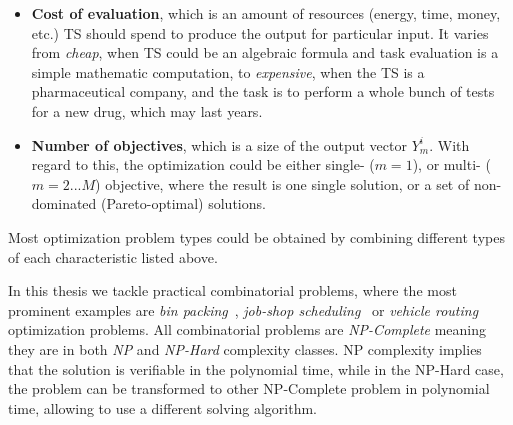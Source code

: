 \begin{itemize}
	\item \textbf{Cost of evaluation}, which is an amount of resources (energy, time, money, etc.) TS should spend to produce the output for particular input. It varies from \emph{cheap}, when TS could be an algebraic formula and task evaluation is a simple mathematic computation, to \emph{expensive}, when the TS is a pharmaceutical company, and the task is to perform a whole bunch of tests for a new drug, which may last years. 

	\item \textbf{Number of objectives}, which is a size of the output vector $Y_m^i$. With regard to this, the optimization could be either single- ($m=1$), or multi- ($m=2...M$) objective, where the result is one single solution, or a set of non-dominated (Pareto-optimal) solutions.
\end{itemize}

Most optimization problem types could be obtained by combining different types of each characteristic listed above.

In this thesis we tackle practical combinatorial problems, where the most prominent examples are \emph{bin packing}~\cite{martello1990bin}, \emph{job-shop scheduling}~\cite{blazewicz1996job} or \emph{vehicle routing}~\cite{toth2002vehicle} optimization problems.
All combinatorial problems are \emph{NP-Complete} meaning they are in both \emph{NP} and \emph{NP-Hard} complexity classes\cite{garey1979computers}. NP complexity implies that the solution is verifiable in the polynomial time, while in the NP-Hard case, the problem can be transformed to other NP-Complete problem in polynomial time, allowing to use a different solving algorithm.

